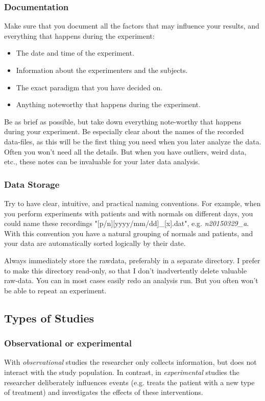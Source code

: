 \subsubsection{Documentation} 
Make sure that you document all the factors that may influence your results, and everything that happens during the experiment:

\begin{itemize}
  \item The date and time of the experiment.
  \item Information about the experimenters and the subjects.
  \item The exact paradigm that you have decided on.
  \item Anything noteworthy that happens during the experiment.
\end{itemize}

Be as brief as possible, but take down everything note-worthy that happens during your experiment. Be especially clear about the names of the recorded data-files, as this will be the first thing you need when you later analyze the data.
Often you won't need all the details. But when you have outliers, weird data, etc., these notes can be invaluable for your later data analysis.

\subsubsection{Data Storage}
Try to have clear, intuitive, and practical naming conventions. For example, when you perform experiments with patients and with normals on different days, you could name these recordings "[p/n][yyyy/mm/dd]\_[x].dat", e.g. \emph{n20150329\_a}. With this convention you have a natural grouping of normals and patients, and your data are automatically sorted logically by their date.

Always immediately store the rawdata, preferably in a separate directory. I prefer to make this directory read-only, so that I don't inadvertently delete valuable raw-data. You can in most cases easily redo an analysis run. But you often won't be able to repeat an experiment.

\subsection{Types of Studies}

\subsubsection{Observational or experimental}
With \emph{observational} studies the researcher only collects information, but does not interact with the study population. In contrast, in \emph{experimental} studies the researcher deliberately influences events (e.g. treats the patient with a new type of treatment) and investigates the effects of these interventions.

